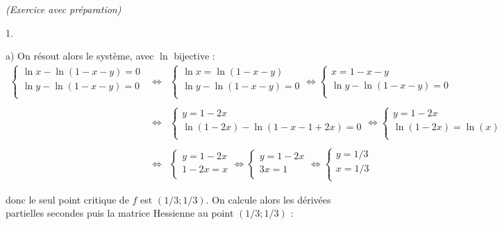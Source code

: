 \documentclass[11pt]{article}%
\begin{document}
\begin{exercice}{\it (Exercice avec préparation)}
\begin{noliste}{1.}
\begin{noliste}{a)}
 On résout alors le système, avec $\ln$ bijective : 
 \begin{eqnarray*}
 \left\{\begin{array}{c}
 \ln x - \ln (1-x-y) = 0 \\
\ln y - \ln (1-x-y) = 0 \\
\end{array}
\right. & \Longleftrightarrow & \left\{\begin{array}{c}
 \ln x = \ln (1-x-y) \\
\ln y - \ln (1-x-y) = 0 \\
\end{array}
\right. \Longleftrightarrow \left\{\begin{array}{c}
 x = 1-x-y \\
\ln y - \ln (1-x-y) = 0 \\
\end{array}
\right. \\
\\
 & \Longleftrightarrow & \left\{\begin{array}{c}
 y = 1- 2 x \\
\ln (1-2x) - \ln (1-x-1 + 2x) = 0 \\
\end{array}
\right. \Longleftrightarrow \left\{\begin{array}{c}
 y = 1- 2 x \\
\ln (1-2x) = \ln (x) \\
\end{array}
\right. \\
\\
 & \Longleftrightarrow & \left\{\begin{array}{c}
 y = 1- 2 x \\
1-2x = x \\
\end{array}
\right. \Longleftrightarrow \left\{\begin{array}{c}
 y = 1- 2 x \\
3x = 1 \\
\end{array}
\right. \Longleftrightarrow \left\{\begin{array}{c}
 y = 1/3 \\
x = 1/3 \\
\end{array}
\right.
 \end{eqnarray*}

 donc le seul point critique de $f$ est $(1/3 ; 1/3)$. On calcule alors
les dérivées partielles secondes puis la matrice Hessienne au point
$(1/3 ; 1/3)$ : 
 

\end{noliste}
\end{noliste}
\end{exercice}
\end{document}
